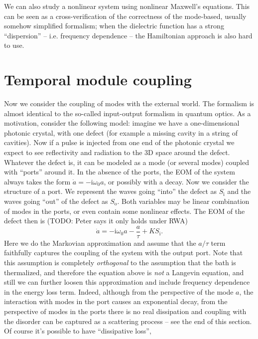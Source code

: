 \documentclass[hyperref, a4paper]{article}
\newcommand*{\ii}{\mathrm{i}}
\newcommand*{\Si}{S_{\text{i}}}
\newcommand*{\So}{S_{\text{o}}}
\begin{document}
We can also study a nonlinear system using nonlinear Maxwell's equations.
This can be seen as a cross-verification of the correctness 
of the mode-based, usually somehow simplified formalism;
when the dielectric function has a strong ``dispersion'' -- i.e. frequency dependence -- 
the Hamiltonian approach is also hard to use.

\section{Temporal module coupling}

Now we consider the coupling of modes with the external world.
The formalism is almost identical to the so-called input-output formalism in quantum optics.
As a motivation, consider the following model: 
imagine we have a one-dimensional photonic crystal, 
with one defect (for example a missing cavity in a string of cavities).
Now if a pulse is injected from one end of the photonic crystal 
we expect to see reflectivity and radiation to the 3D space around the defect.
Whatever the defect is, it can be modeled as a mode (or several modes)
coupled with ``ports'' around it.
In the absence of the ports, the EOM of the system always takes the form 
$\dot{a} = - \ii \omega_0 a$, 
or possibly with a decay. 
Now we consider the structure of a port. 
We represent the waves going ``into'' the defect as $\Si$
and the waves going ``out'' of the defect as $\So$.
Both variables may be linear combination of modes in the ports, 
or even contain some nonlinear effects.
The EOM of the defect then is (TODO: Peter says it only holds under RWA) 
\begin{equation}
    \dot{a} = - \ii \omega_0 a - \frac{a}{\tau} + K \Si.
\end{equation}
Here we do the Markovian approximation and assume that the $a / \tau$ term
faithfully captures the coupling of the system with the output port.
Note that this assumption is completely \emph{orthogonal} 
to the assumption that the bath is thermalized, 
and therefore the equation above is \emph{not} a Langevin equation,
and still we can further loosen this approximation 
and include frequency dependence in the energy loss term.
Indeed, although from the perspective of the mode $a$, 
the interaction with modes in the port causes an exponential decay, 
from the perspective of modes in the ports 
there is no real dissipation and coupling with the disorder can be captured as a scattering process 
-- see the end of this section. 
Of course it's possible to have ``dissipative loss'', 
\end{document}
